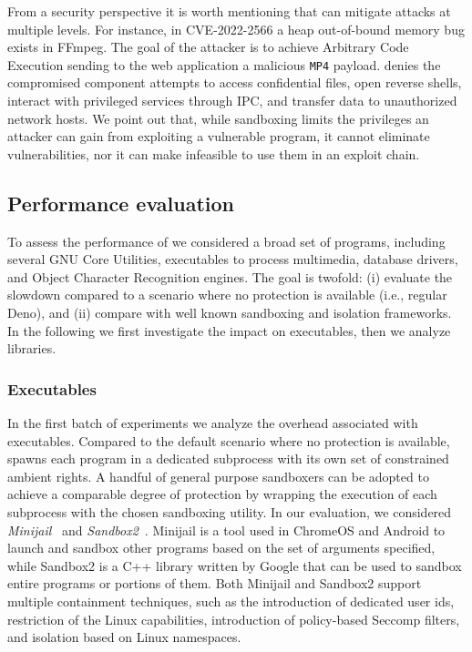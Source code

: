 From a security perspective it is worth mentioning that \natisand can
mitigate attacks at multiple levels. For instance, in CVE-2022-2566 a
heap out-of-bound memory bug exists in FFmpeg. The goal of the
attacker is to achieve Arbitrary Code Execution sending to the web
application a malicious {\tt MP4} payload. \natisand denies the compromised
component attempts to access confidential files, open reverse shells,
interact with privileged services through IPC, and transfer data to
unauthorized network hosts. We point out that, while sandboxing limits
the privileges an attacker can gain from exploiting a vulnerable
program, it cannot eliminate vulnerabilities, nor it can
make infeasible to use them in an exploit chain.


\subsection{Performance evaluation}
\label{subsect:performance-eval}

To assess the performance of \natisand we considered a broad set of
programs, including several GNU Core Utilities, executables to process
multimedia, database drivers, and Object Character Recognition
engines. The goal is twofold: (i) evaluate the slowdown compared to a
scenario where no protection is available (i.e., regular Deno), and
(ii) compare \natisand with well known sandboxing and isolation frameworks.
In the following we first investigate the impact on executables, then
we analyze libraries.

\subsubsection{Executables}

In the first batch of experiments we analyze the overhead associated
with executables. Compared to the default scenario where no protection
is available, \natisand spawns each program in a dedicated subprocess with
its own set of constrained ambient rights. A handful of
general purpose sandboxers can be adopted to achieve a comparable
degree of protection by wrapping the execution of each subprocess with the chosen sandboxing utility. In our evaluation, we considered {\em
  Minijail}~\cite{minijail} and {\em Sandbox2}~\cite{sandbox2}.
Minijail is a tool used in ChromeOS and Android to launch and sandbox
other programs based on the set of arguments specified, while Sandbox2
is a C++ library written by Google that can be used to sandbox entire
programs or portions of them. Both Minijail and Sandbox2 support
multiple containment techniques, such as the introduction of dedicated
user ids, restriction of the Linux capabilities, introduction of
policy-based Seccomp filters, and isolation based on Linux namespaces.

